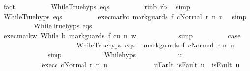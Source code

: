 \begin{isabellebody}
\ fact\isanewline
\ \ \ \ \ \ \ \ \isamarkupfalse%
\ WhileTrue{\isachardot}hyps\ eqs\isanewline
\ \ \ \ \ \ \ \ \isamarkupfalse%
\ r{\isacharunderscore}in{\isacharunderscore}b{\isacharcolon}\ {\isachardoublequoteopen}r{\isasymin}b{\isachardoublequoteclose}\ \isamarkupfalse%
\ simp\isanewline
\ \ \ \ \ \ \ \ \isamarkupfalse%
\ WhileTrue{\isachardot}hyps\ eqs\isanewline
\ \ \ \ \ \ \ \ \isamarkupfalse%
\ exec{\isacharunderscore}mark{\isacharunderscore}c{\isacharcolon}\ {\isachardoublequoteopen}{\isasymGamma}{\isasymturnstile}{\isasymlangle}mark{\isacharunderscore}guards\ f\ c{\isacharcomma}Normal\ r{\isasymrangle}\ {\isacharequal}n{\isasymRightarrow}\ u{\isachardoublequoteclose}\ \isamarkupfalse%
\ simp\isanewline
\ \ \ \ \ \ \ \ \isamarkupfalse%
\ WhileTrue{\isachardot}hyps\ eqs\isanewline
\ \ \ \ \ \ \ \ \isamarkupfalse%
\ exec{\isacharunderscore}mark{\isacharunderscore}w{\isacharcolon}\ {\isachardoublequoteopen}{\isasymGamma}{\isasymturnstile}{\isasymlangle}While\ b\ {\isacharparenleft}mark{\isacharunderscore}guards\ f\ c{\isacharparenright}{\isacharcomma}u{\isasymrangle}\ {\isacharequal}n{\isasymRightarrow}\ w{\isachardoublequoteclose}\isanewline
\ \ \ \ \ \ \ \ \ \ \isamarkupfalse%
\ simp\isanewline
\ \ \ \ \ \ \ \ \isamarkupfalse%
\ {\isacharquery}case\isanewline
\ \ \ \ \ \ \ \ \isamarkupfalse%
\ {\isacharminus}\isanewline
\ \ \ \ \ \ \ \ \ \ \isamarkupfalse%
\ WhileTrue{\isachardot}hyps\ eqs\ \isamarkupfalse%
\ {\isachardoublequoteopen}{\isasymGamma}{\isasymturnstile}{\isasymlangle}mark{\isacharunderscore}guards\ f\ c{\isacharcomma}Normal\ r{\isasymrangle}\ {\isacharequal}n{\isasymRightarrow}\ u{\isachardoublequoteclose}\isanewline
\ \ \ \ \ \ \ \ \ \ \ \ \isamarkupfalse%
\ simp\isanewline
\ \ \ \ \ \ \ \ \ \ \isamarkupfalse%
\ While{\isachardot}hyps\isanewline
\ \ \ \ \ \ \ \ \ \ \isamarkupfalse%
\ u{\isacharprime}\ \ \isanewline
\ \ \ \ \ \ \ \ \ \ \ \ exec{\isacharunderscore}c{\isacharcolon}\ {\isachardoublequoteopen}{\isasymGamma}{\isasymturnstile}{\isasymlangle}c{\isacharcomma}Normal\ r{\isasymrangle}\ {\isacharequal}n{\isasymRightarrow}\ u{\isacharprime}{\isachardoublequoteclose}\ \isanewline
\ \ \ \ \ \ \ \ \ \ \ \ u{\isacharunderscore}Fault{\isacharcolon}\ {\isachardoublequoteopen}isFault\ u\ {\isasymlongrightarrow}\ isFault\ u{\isacharprime}{\isachardoublequoteclose}\ \isanewline

\end{isabellebody}
